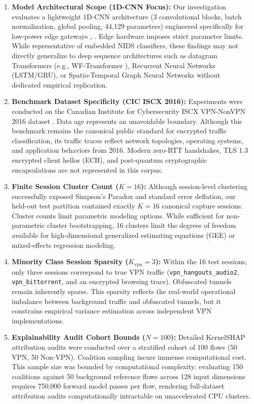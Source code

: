 \documentclass[conference]{IEEEtran}
\begin{document}
\begin{enumerate}
    \item \textbf{Model Architectural Scope (1D-CNN Focus):} Our investigation evaluates a lightweight 1D-CNN architecture (3 convolutional blocks, batch normalization, global pooling, 44,129 parameters) engineered specifically for low-power edge gateways \cite{b2}, \cite{b3}. Edge hardware imposes strict parameter limits. While representative of embedded NIDS classifiers, these findings may not directly generalize to deep sequence architectures such as datagram Transformers (e.g., WF-Transformer \cite{b30}), Recurrent Neural Networks (LSTM/GRU), or Spatio-Temporal Graph Neural Networks without dedicated empirical replication.
    \item \textbf{Benchmark Dataset Specificity (CIC ISCX 2016):} Experiments were conducted on the Canadian Institute for Cybersecurity ISCX VPN-NonVPN 2016 dataset \cite{b1}. Data age represents an unavoidable boundary. Although this benchmark remains the canonical public standard for encrypted traffic classification, its traffic traces reflect network topologies, operating systems, and application behaviors from 2016. Modern zero-RTT handshakes, TLS 1.3 encrypted client hellos (ECH), and post-quantum cryptographic encapsulations are not represented in this corpus.
    \item \textbf{Finite Session Cluster Count ($K = 16$):} Although session-level clustering successfully exposed Simpson's Paradox and standard error deflation, our held-out test partition contained exactly $K = 16$ canonical capture sessions. Cluster counts limit parametric modeling options. While sufficient for non-parametric cluster bootstrapping, 16 clusters limit the degrees of freedom available for high-dimensional generalized estimating equations (GEE) or mixed-effects regression modeling.
    \item \textbf{Minority Class Session Sparsity ($K_{\text{vpn}} = 3$):} Within the 16 test sessions, only three sessions correspond to true VPN traffic (\texttt{vpn\_hangouts\_audio2}, \texttt{vpn\_bittorrent}, and an encrypted browsing trace). Obfuscated tunnels remain inherently sparse. This sparsity reflects the real-world operational imbalance between background traffic and obfuscated tunnels, but it constrains empirical variance estimation across independent VPN implementations.
    \item \textbf{Explainability Audit Cohort Bounds ($N = 100$):} Detailed KernelSHAP attribution audits were conducted over a stratified cohort of 100 flows (50 VPN, 50 Non-VPN). Coalition sampling incurs immense computational cost. This sample size was bounded by computational complexity: evaluating 150 coalitions against 50 background reference flows across 128 input dimensions requires 750,000 forward model passes per flow, rendering full-dataset attribution audits computationally intractable on unaccelerated CPU clusters.

\end{enumerate}
\end{document}
